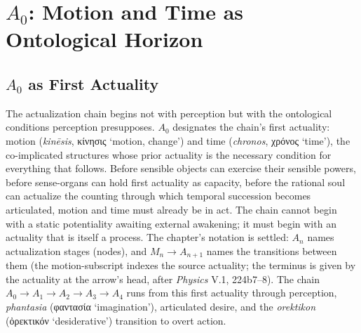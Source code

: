 \documentclass{article}
\newcommand{\gk}[1]{{\greekfont #1}}
\begin{document}
\section{$A_0$: Motion and Time as Ontological Horizon}

\subsection{$A_0$ as First Actuality}

The actualization chain begins not with perception but with the ontological conditions perception presupposes. $A_0$ designates the chain's first actuality: motion (\textit{kinēsis}, \gk{κίνησις} `motion, change') and time (\textit{chronos}, \gk{χρόνος} `time'), the co-implicated structures whose prior actuality is the necessary condition for everything that follows. Before sensible objects can exercise their sensible powers, before sense-organs can hold first actuality as capacity, before the rational soul can actualize the counting through which temporal succession becomes articulated, motion and time must already be in act. The chain cannot begin with a static potentiality awaiting external awakening; it must begin with an actuality that is itself a process. The chapter's notation is settled: $A_n$ names actualization stages (nodes), and $M_n \rightarrow A_{n+1}$ names the transitions between them (the motion-subscript indexes the source actuality; the terminus is given by the actuality at the arrow's head, after \textit{Physics} V.1, 224b7--8). The chain $A_0 \rightarrow A_1 \rightarrow A_2 \rightarrow A_3 \rightarrow A_4$ runs from this first actuality through perception, \textit{phantasia} (\gk{φαντασία} `imagination'), articulated desire, and the \textit{orektikon} (\gk{ὀρεκτικόν} `desiderative') transition to overt action.
\end{document}
